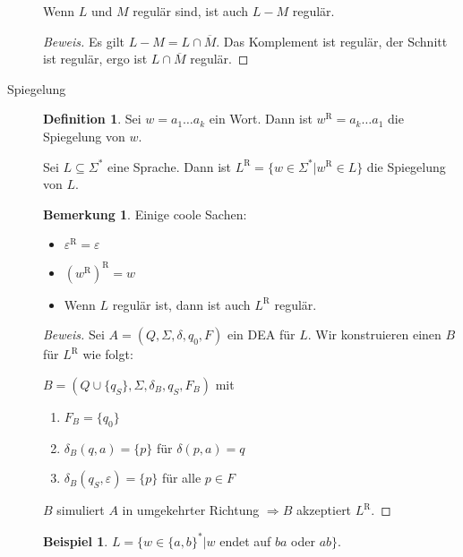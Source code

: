 \documentclass[11pt]{article} %
\theoremstyle{definition}
\newtheorem*{beispiel}{Beispiel}
\newtheorem{definition}{Definition}
\newtheorem*{bemerkung}{Bemerkung}
\begin{document}
\begin{description}
Wenn $L$ und $M$ regulär sind, ist auch $L-M$ regulär.

\begin{proof}[Beweis]
Es gilt $L - M = L \cap \overline{M}$. Das Komplement ist regulär, der Schnitt ist regulär, ergo ist $L \cap \overline{M}$ regulär.
\end{proof}

\item[Spiegelung]
\begin{definition}
Sei $w = a_1\dots a_k$ ein Wort. Dann ist $w^\textrm{R} = a_k\dots a_1$ die Spiegelung von $w$.

Sei $L \subseteq \Sigma^*$ eine Sprache. Dann ist $L^\textrm{R} = \{ w \in \Sigma^* | w^\textrm{R} \in L \}$ die Spiegelung von $L$.
 
\end{definition}
\begin{bemerkung} Einige coole Sachen:
\begin{itemize}
\item $\varepsilon^\textrm{R} = \varepsilon$
\item $(w^\textrm{R})^\textrm{R} = w$
\item Wenn $L$ regulär ist, dann ist auch $L^\textrm{R}$ regulär.
\end{itemize}
\end{bemerkung}

\begin{proof}[Beweis]
Sei $A = (Q, \Sigma, \delta, q_0, F)$ ein DEA für $L$. Wir konstruieren einen \enea $B$ für $L^\textrm{R}$ wie folgt:

$B = (Q \cup \{q_S\}, \Sigma, \delta_B, q_S, F_B)$ mit
\begin{enumerate}
\item $F_B = \{q_0 \}$
\item $\delta_B(q, a) = \{p\}$ für $\delta(p,a) = q$
\item $\delta_B(q_S, \varepsilon) = \{p \}$ für alle $p \in F$
\end{enumerate}

$B$ simuliert $A$ in umgekehrter Richtung $\Rightarrow B$ akzeptiert $L^\textrm{R}$.
\end{proof}

\begin{beispiel}
$L = \{w \in \{a,b\}^* | w $ endet auf $ba$ oder $ab\}$.


\end{beispiel}
\end{description}
\end{document}
